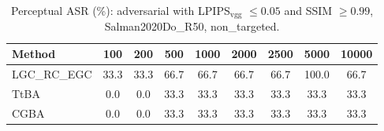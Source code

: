 \begin{table}[t]
\centering\footnotesize
\caption{Perceptual ASR (\%): adversarial with LPIPS$_{\mathrm{vgg}}$ $\le 0.05$ and SSIM $\ge 0.99$, Salman2020Do\_R50, non\_targeted.}
\begin{tabular}{lcccccccc}
\toprule
Method & 100 & 200 & 500 & 1000 & 2000 & 2500 & 5000 & 10000 \\
\midrule
LGC\_RC\_EGC & 33.3 & 33.3 & 66.7 & 66.7 & 66.7 & 66.7 & 100.0 & 66.7 \\
TtBA & 0.0 & 0.0 & 33.3 & 33.3 & 33.3 & 33.3 & 33.3 & 33.3 \\
CGBA & 0.0 & 0.0 & 33.3 & 33.3 & 33.3 & 33.3 & 33.3 & 33.3 \\
\bottomrule
\end{tabular}
\end{table}

